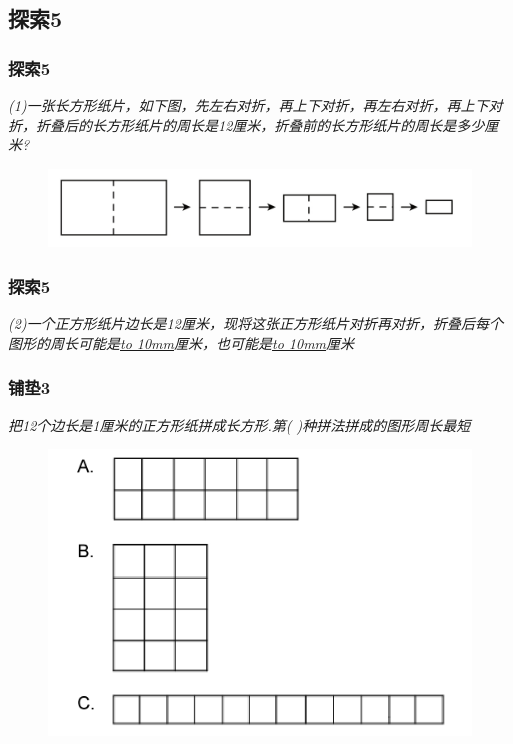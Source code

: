 \subsection{探索5}
\begin{frame}
    \frametitle{探索5}
    \textit{(1)一张长方形纸片，如下图，先左右对折，再上下对折，再左右对折，再上下对折，折叠后的长方形纸片的周长是12厘米，折叠前的长方形纸片的周长是多少厘米?}
    \begin{figure}[H] 
        \centering
        \includegraphics[width=1\textwidth]{./pics/Chapter_1/tansuo5.png}
    \end{figure}
\end{frame}

\begin{frame}
    \frametitle{探索5}
    \textit{(2)一个正方形纸片边长是12厘米，现将这张正方形纸片对折再对折，折叠后每个图形的周长可能是\underline{\hbox to 10mm{}}厘米，也可能是\underline{\hbox to 10mm{}}厘米}
\end{frame}

\begin{frame}
    \frametitle{铺垫3}
    \textit{把12个边长是1厘米的正方形纸拼成长方形.第( )种拼法拼成的图形周长最短}
    \begin{figure}[H] 
        \centering
        \includegraphics[width=1\textwidth]{./pics/Chapter_1/pudian3.png}
    \end{figure}
\end{frame}

